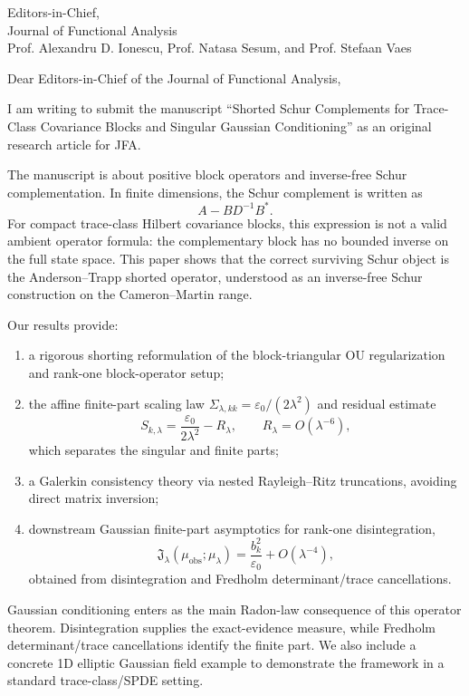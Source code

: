 \documentclass[11pt]{letter}
\begin{document}
\begin{letter}{Editors-in-Chief, \\ Journal of Functional Analysis\\
Prof. Alexandru D. Ionescu, Prof. Natasa Sesum, and Prof. Stefaan Vaes}
\date{2026-06-11}
\opening{Dear Editors-in-Chief of the Journal of Functional Analysis,}

I am writing to submit the manuscript ``Shorted Schur Complements for Trace-Class Covariance Blocks and Singular Gaussian Conditioning'' as an original research article for JFA.

The manuscript is about positive block operators and inverse-free Schur complementation.  In finite dimensions, the Schur complement is written as
\[
A - B D^{-1} B^*.
\]
For compact trace-class Hilbert covariance blocks, this expression is not a valid ambient operator formula: the complementary block has no bounded inverse on the full state space.  This paper shows that the correct surviving Schur object is the Anderson--Trapp shorted operator, understood as an inverse-free Schur construction on the Cameron--Martin range.

Our results provide:
\begin{enumerate}
  \item a rigorous shorting reformulation of the block-triangular OU regularization and rank-one block-operator setup;
  \item the affine finite-part scaling law $\Sigma_{\lambda,kk}=\varepsilon_0/(2\lambda^2)$ and residual estimate
  \[
  S_{k,\lambda}=\frac{\varepsilon_0}{2\lambda^2}-R_\lambda,\qquad R_\lambda=O(\lambda^{-6}),
  \]
  which separates the singular and finite parts;
  \item a Galerkin consistency theory via nested Rayleigh--Ritz truncations, avoiding direct matrix inversion;
  \item downstream Gaussian finite-part asymptotics for rank-one disintegration,
  \[
  \mathfrak{J}_\lambda(\mu_{\mathrm{obs}};\mu_\lambda)=\frac{b_k^2}{\varepsilon_0}+O(\lambda^{-4}),
  \]
  obtained from disintegration and Fredholm determinant/trace cancellations.
\end{enumerate}

Gaussian conditioning enters as the main Radon-law consequence of this operator theorem.  Disintegration supplies the exact-evidence measure, while Fredholm determinant/trace cancellations identify the finite part.  We also include a concrete 1D elliptic Gaussian field example to demonstrate the framework in a standard trace-class/SPDE setting.


\end{letter}
\end{document}
